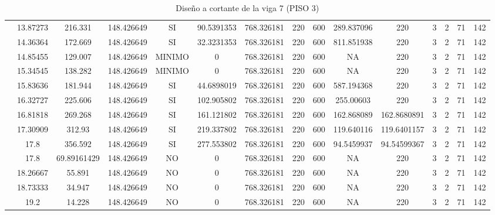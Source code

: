 \begin{table}[H]
{\begin{tabular}{|c|c|c|c|c|c|c|c|c|c|c|c|c|c|c|}
\cline{2-15}    & 13.87273 & 216.331 & 148.426649 & SI  & 90.5391353 & 768.326181 & 220 & 600 & 289.837096 & 220 & 3   & 2   & 71  & 142 \bigstrut\\
\cline{2-15}    & 14.36364 & 172.669 & 148.426649 & SI  & 32.3231353 & 768.326181 & 220 & 600 & 811.851938 & 220 & 3   & 2   & 71  & 142 \bigstrut\\
\cline{2-15}    & 14.85455 & 129.007 & 148.426649 & MINIMO & 0   & 768.326181 & 220 & 600 & NA  & 220 & 3   & 2   & 71  & 142 \bigstrut\\
\cline{2-15}    & 15.34545 & 138.282 & 148.426649 & MINIMO & 0   & 768.326181 & 220 & 600 & NA  & 220 & 3   & 2   & 71  & 142 \bigstrut\\
\cline{2-15}    & 15.83636 & 181.944 & 148.426649 & SI  & 44.6898019 & 768.326181 & 220 & 600 & 587.194368 & 220 & 3   & 2   & 71  & 142 \bigstrut\\
\cline{2-15}    & 16.32727 & 225.606 & 148.426649 & SI  & 102.905802 & 768.326181 & 220 & 600 & 255.00603 & 220 & 3   & 2   & 71  & 142 \bigstrut\\
\cline{2-15}    & 16.81818 & 269.268 & 148.426649 & SI  & 161.121802 & 768.326181 & 220 & 600 & 162.868089 & 162.8680891 & 3   & 2   & 71  & 142 \bigstrut\\
\cline{2-15}    & 17.30909 & 312.93 & 148.426649 & SI  & 219.337802 & 768.326181 & 220 & 600 & 119.640116 & 119.6401157 & 3   & 2   & 71  & 142 \bigstrut\\
\cline{2-15}    & 17.8 & 356.592 & 148.426649 & SI  & 277.553802 & 768.326181 & 220 & 600 & 94.5459937 & 94.54599367 & 3   & 2   & 71  & 142 \bigstrut\\
\cline{2-15}    & 17.8 & 69.89161429 & 148.426649 & NO  & 0   & 768.326181 & 220 & 600 & NA  & 220 & 3   & 2   & 71  & 142 \bigstrut\\
\cline{2-15}    & 18.26667 & 55.891 & 148.426649 & NO  & 0   & 768.326181 & 220 & 600 & NA  & 220 & 3   & 2   & 71  & 142 \bigstrut\\
\cline{2-15}    & 18.73333 & 34.947 & 148.426649 & NO  & 0   & 768.326181 & 220 & 600 & NA  & 220 & 3   & 2   & 71  & 142 \bigstrut\\
\cline{2-15}    & 19.2 & 14.228 & 148.426649 & NO  & 0   & 768.326181 & 220 & 600 & NA  & 220 & 3   & 2   & 71  & 142 \bigstrut\\
\hline
\end{tabular}%



  

  }%
    \caption{Diseño a cortante de la viga 7 (PISO 3) }
  \label{tab:C VG7 P3 }%
\end{table}%
